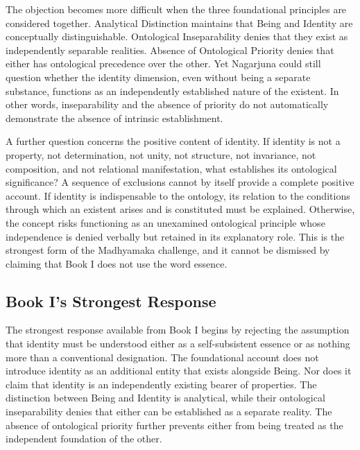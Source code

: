 \label{para:VS.B01.P01.C08.S18.SS14.P002}
The objection becomes more difficult when the three foundational principles are considered together. Analytical Distinction maintains that Being and Identity are conceptually distinguishable. Ontological Inseparability denies that they exist as independently separable realities. Absence of Ontological Priority denies that either has ontological precedence over the other. Yet Nagarjuna could still question whether the identity dimension, even without being a separate substance, functions as an independently established nature of the existent. In other words, inseparability and the absence of priority do not automatically demonstrate the absence of intrinsic establishment.

\label{para:VS.B01.P01.C08.S18.SS14.P003}
A further question concerns the positive content of identity. If identity is not a property, not determination, not unity, not structure, not invariance, not composition, and not relational manifestation, what establishes its ontological significance? A sequence of exclusions cannot by itself provide a complete positive account. If identity is indispensable to the ontology, its relation to the conditions through which an existent arises and is constituted must be explained. Otherwise, the concept risks functioning as an unexamined ontological principle whose independence is denied verbally but retained in its explanatory role. This is the strongest form of the Madhyamaka challenge, and it cannot be dismissed by claiming that Book I does not use the word essence.

\subsection{Book I's Strongest Response}
\label{subsec:ch08_s18_ss15}

\label{para:VS.B01.P01.C08.S18.SS15.P001}
The strongest response available from Book I begins by rejecting the assumption that identity must be understood either as a self-subsistent essence or as nothing more than a conventional designation. The foundational account does not introduce identity as an additional entity that exists alongside Being. Nor does it claim that identity is an independently existing bearer of properties. The distinction between Being and Identity is analytical, while their ontological inseparability denies that either can be established as a separate reality. The absence of ontological priority further prevents either from being treated as the independent foundation of the other.

